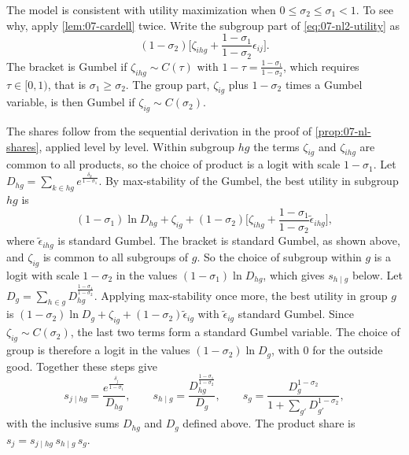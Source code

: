 The model is consistent with utility maximization when $0 \le \sigma_2 \le \sigma_1 < 1$. To see why, apply
\cref{lem:07-cardell} twice. Write the subgroup part of \eqref{eq:07-nl2-utility} as
\begin{equation*}
(1-\sigma_2)\Big[\zeta_{ihg} + \frac{1-\sigma_1}{1-\sigma_2}\epsilon_{ij}\Big] .
\end{equation*}
The bracket is Gumbel if $\zeta_{ihg} \sim C(\tau)$ with $1 - \tau = \frac{1-\sigma_1}{1-\sigma_2}$, which requires
$\tau \in [0, 1)$, that is $\sigma_1 \ge \sigma_2$. The group part, $\zeta_{ig}$ plus $1 - \sigma_2$
times a Gumbel variable, is then Gumbel if $\zeta_{ig} \sim C(\sigma_2)$.

The shares follow from the sequential derivation in the proof of \cref{prop:07-nl-shares}, applied level by level.
Within subgroup $hg$ the terms $\zeta_{ig}$ and $\zeta_{ihg}$ are common to all products, so the choice of product is
a logit with scale $1 - \sigma_1$. Let $D_{hg} = \sum_{k \in hg}e^{\frac{\delta_k}{1-\sigma_1}}$. By max-stability of
the Gumbel, the best utility in subgroup $hg$ is
\begin{equation*}
(1-\sigma_1)\ln D_{hg} + \zeta_{ig} + (1-\sigma_2)\Big[\zeta_{ihg} + \frac{1-\sigma_1}{1-\sigma_2}\tilde\epsilon_{ihg}\Big],
\end{equation*}
where $\tilde\epsilon_{ihg}$ is standard Gumbel. The bracket is standard Gumbel, as shown above, and $\zeta_{ig}$ is
common to all subgroups of $g$. So the choice of subgroup within $g$ is a logit with scale $1 - \sigma_2$ in the
values $(1-\sigma_1)\ln D_{hg}$, which gives $s_{h \mid g}$ below. Let $D_g = \sum_{h \in g}D_{hg}^{\frac{1-\sigma_1}{1-\sigma_2}}$.
Applying max-stability once more, the best utility in group $g$ is $(1-\sigma_2)\ln D_g + \zeta_{ig} +
(1-\sigma_2)\tilde\epsilon_{ig}$ with $\tilde\epsilon_{ig}$ standard Gumbel. Since $\zeta_{ig} \sim C(\sigma_2)$, the
last two terms form a standard Gumbel variable. The choice of group is therefore a logit in the values
$(1-\sigma_2)\ln D_g$, with $0$ for the outside good. Together these steps give
\begin{equation}\label{eq:07-nl2-shares}
s_{j \mid hg} = \frac{e^{\frac{\delta_j}{1-\sigma_1}}}{D_{hg}}, \qquad
s_{h \mid g} = \frac{D_{hg}^{\frac{1-\sigma_1}{1-\sigma_2}}}{D_g}, \qquad
s_g = \frac{D_g^{1-\sigma_2}}{1 + \sum_{g'}D_{g'}^{1-\sigma_2}} ,
\end{equation}
with the inclusive sums $D_{hg}$ and $D_g$ defined above. The product share is
$s_j = s_{j \mid hg}\,s_{h \mid g}\,s_g$.

